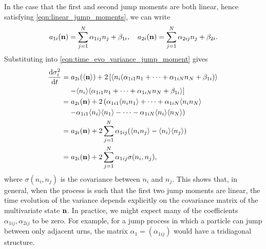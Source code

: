 In the case that the first and second jump moments are both linear, hence
satisfying \eqref{eqn:linear_jump_moments}, we can write
\begin{equation*}
    a_{1i}(\mathbf{n}) = \sum_{j=1}^N \alpha_{1ij} n_j + \beta_{1i}, \quad
    a_{2i}(\mathbf{n}) = \sum_{j=1}^N \alpha_{2ij} n_j + \beta_{2i}.
\end{equation*}
Substituting into \eqref{eqn:time_evo_variance_jump_moment} gives
\begin{equation}
    \begin{aligned}
        \frac{\mathrm{d} \sigma_i^2}{\mathrm{d} t} &= a_{2i}(\langle \mathbf{n} \rangle) + 2\left[ \langle n_i (\alpha_{1i1}n_1 +
            \dotsb + \alpha_{1iN}n_N + \beta_{1i}) \rangle \right.\\
            &\left. \quad - \langle n_i \rangle \langle  \alpha_{1i1}n_1 +
        \dotsb + \alpha_{1iN}n_N + \beta_{1i} \rangle \right]\\
        &= a_{2i}(\mathbf{n}) + 2\left( \alpha_{1i1}\langle n_i n_1 \rangle + \dotsb +
        \alpha_{1iN}\langle n_i n_N \rangle\right.\\
        &\quad \left. - \alpha_{1i1}\langle n_i \rangle\langle n_1 \rangle - \dotsb -
        \alpha_{1iN}\langle n_i \rangle\langle n_N \rangle \right)\\
        &= a_{2i}(\mathbf{n}) + 2 \sum_{j=1}^N \alpha_{1ij}(\langle n_i n_j \rangle -
        \langle n_i \rangle\langle n_j \rangle)\\
        &= a_{2i}(\mathbf{n}) + 2 \sum_{j=1}^N \alpha_{1ij}\sigma(n_i,n_j),
    \end{aligned}
\end{equation}
where \(\sigma(n_i, n_j)\) is the covariance between \(n_i\) and \(n_j\).
This shows that, in general, when the process is such that the first two jump
moments are linear, the time evolution of the variance depends explicitly on the
covariance matrix of the multivariate state \(\mathbf{n}\). In practice, we might
expect many of the coefficients \(\alpha_{1ij}, \alpha_{2ij}\) to be zero. For
example, for a jump process in which a particle can jump between only adjacent
urns, the matrix \(\alpha_1 = (\alpha_{1ij})\) would have a tridiagonal
structure.

